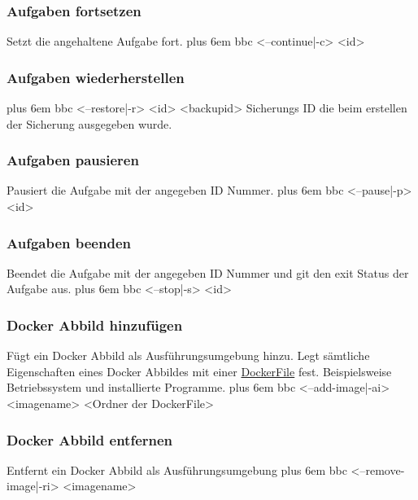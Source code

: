 \documentclass[a4paper,12pt]{article}
\makeatletter
\newenvironment{mycode}
 {\def\@xobeysp{\ }\verbatim\rightskip=0pt plus 6em\relax}
 {\endverbatim}
\makeatother
\begin{document}
\subsubsection{Aufgaben fortsetzen}
Setzt die angehaltene Aufgabe fort.
\begin{mycode}
bbc <--continue|-c> <id>
\end{mycode}

\subsubsection{Aufgaben wiederherstellen}
\begin{mycode}
bbc <--restore|-r> <id> <backupid>
\end{mycode}
Sicherungs ID die beim erstellen der Sicherung ausgegeben wurde.

\subsubsection{Aufgaben pausieren}
Pausiert die Aufgabe mit der angegeben ID Nummer.
\begin{mycode}
bbc <--pause|-p> <id>
\end{mycode}

\subsubsection{Aufgaben beenden}
Beendet die Aufgabe mit der angegeben ID Nummer und git den exit Status der Aufgabe aus.
\begin{mycode}
bbc <--stop|-s> <id>
\end{mycode}

\subsubsection{Docker Abbild hinzufügen}
Fügt ein Docker Abbild als Ausführungsumgebung hinzu.
Legt sämtliche Eigenschaften eines Docker Abbildes mit einer \href{https://docs.docker.com/engine/reference/builder/}{DockerFile} fest.
Beispielsweise Betriebssystem und installierte Programme. 
\begin{mycode}
bbc <--add-image|-ai> <imagename> <Ordner der DockerFile>
\end{mycode}

\subsubsection{Docker Abbild entfernen}
Entfernt ein Docker Abbild als Ausführungsumgebung
\begin{mycode}
bbc <--remove-image|-ri> <imagename>
\end{mycode}
\end{document}
